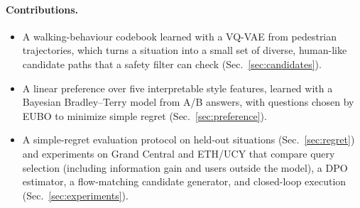 \paragraph{Contributions.}
\begin{itemize}
  \item A walking-behaviour codebook learned with a VQ-VAE from pedestrian trajectories, which turns a situation into a small set of
        diverse, human-like candidate paths that a safety filter can check (Sec.~\ref{sec:candidates}).
  \item A linear preference over five interpretable style features, learned with a Bayesian Bradley--Terry model from A/B answers,
        with questions chosen by EUBO to minimize simple regret (Sec.~\ref{sec:preference}).
  \item A simple-regret evaluation protocol on held-out situations (Sec.~\ref{sec:regret}) and experiments on Grand Central and
        ETH/UCY that compare query selection (including information gain and users outside the model), a DPO estimator, a flow-matching candidate generator, and closed-loop execution
        (Sec.~\ref{sec:experiments}).
\end{itemize}
